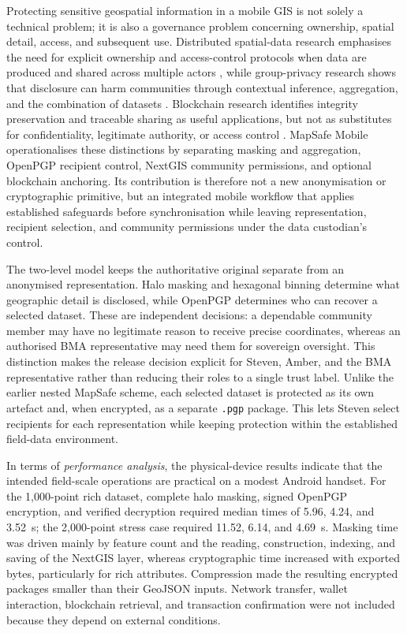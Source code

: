 \documentclass[]{interact}
\begin{document}
Protecting sensitive geospatial information in a mobile GIS is not solely a technical problem; it is also a governance problem concerning ownership, spatial detail, access, and subsequent use. Distributed spatial-data research emphasises the need for explicit ownership and access-control protocols when data are produced and shared across multiple actors \citep{hojati2023distributed}, while group-privacy research shows that disclosure can harm communities through contextual inference, aggregation, and the combination of datasets \citep{masinde2023group}. Blockchain research identifies integrity preservation and traceable sharing as useful applications, but not as substitutes for confidentiality, legitimate authority, or access control \citep{zhao2022geospatial}. MapSafe Mobile operationalises these distinctions by separating masking and aggregation, OpenPGP recipient control, NextGIS community permissions, and optional blockchain anchoring. Its contribution is therefore not a new anonymisation or cryptographic primitive, but an integrated mobile workflow that applies established safeguards before synchronisation while leaving representation, recipient selection, and community permissions under the data custodian’s control.

The two-level model keeps the authoritative original separate from an anonymised representation. Halo masking and hexagonal binning determine what geographic detail is disclosed, while OpenPGP determines who can recover a selected dataset. These are independent decisions: a dependable community member may have no legitimate reason to receive precise coordinates, whereas an authorised BMA representative may need them for sovereign oversight. This distinction makes the release decision explicit for Steven, Amber, and the BMA representative rather than reducing their roles to a single trust label. Unlike the earlier nested MapSafe scheme, each selected dataset is protected as its own artefact and, when encrypted, as a separate \texttt{.pgp} package. This lets Steven select recipients for each representation while keeping protection within the established field-data environment.

In terms of \textit{performance analysis}, the physical-device results indicate that the intended field-scale operations are practical on a modest Android handset. For the 1,000-point rich dataset, complete halo masking, signed OpenPGP encryption, and verified decryption required median times of 5.96, 4.24, and 3.52~s; the 2,000-point stress case required 11.52, 6.14, and 4.69~s. Masking time was driven mainly by feature count and the reading, construction, indexing, and saving of the NextGIS layer, whereas cryptographic time increased with exported bytes, particularly for rich attributes. Compression made the resulting encrypted packages smaller than their GeoJSON inputs. Network transfer, wallet interaction, blockchain retrieval, and transaction confirmation were not included because they depend on external conditions.
\end{document}

